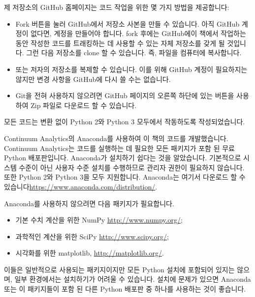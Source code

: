 \documentclass[12pt]{book} \usepackage[width=5.5in,height=8.5in, hmarginratio=3:2,vmarginratio=1:1]{geometry}
\begin{document}
제 저장소의 GitHub 홈페이지는 코드 작업을 위한 몇 가지 방법을 제공합니다: 

\begin{itemize} 

\item {\sf Fork} 버튼을 눌러 GitHub에서 저장소 사본을 만들 수 있습니다. 아직 GitHub 계정이 없다면, 계정을 만들어야 합니다. fork 후에는 GitHub에이 책에서 작업하는 동안 작성한 코드를 트래킹하는 데 사용할 수 있는 자체 저장소를 갖게 될 것입니다. 그런 다음 저장소를 clone 할 수 있습니다. 즉, 파일을 컴퓨터에 복사합니다.  

\item 또는 저자의 저장소를 복제할 수 있습니다. 이를 위해 GitHub 계정이 필요하지는 않지만 변경 사항을 GitHub에 다시 쓸 수는 없습니다.  

\item Git을 전혀 사용하지 않으려면 GitHub 페이지의 오른쪽 하단에 있는 버튼을 사용하여 Zip 파일로 다운로드 할 수 있습니다. 

\end{itemize} 

모든 코드는 변환 없이 Python 2와 Python 3 모두에서 작동하도록 작성되었습니다. 

Continuum Analytics의 Anaconda를 사용하여 이 책의 코드를 개발했습니다. Continuum Analytics는 코드를 실행하는 데 필요한 모든 패키지가 포함 된 무료 Python 배포판입니다. Anaconda가 설치하기 쉽다는 것을 알았습니다. 기본적으로 시스템 수준이 아닌 사용자 수준 설치를 수행하므로 관리자 권한이 필요하지 않습니다. 또한 Python 2와 Python 3을 모두 지원합니다. Anaconda는 여기서 다운로드 할 수 있습니다\url{https://www.anaconda.com/distribution/}.  

Anaconda를 사용하지 않으려면 다음 패키지가 필요합니다. 

\begin{itemize} 

\item 기본 수치 계산을 위한 NumPy \url{http://www.numpy.org/};  

\item 과학적인 계산을 위한 SciPy \url{http://www.scipy.org/};  

\item 시각화를 위한 matplotlib, \url{http://matplotlib.org/}.  

\end{itemize} 

이들은 일반적으로 사용되는 패키지이지만 모든 Python 설치에 포함되어 있지는 않으며, 일부 환경에서는 설치하기가 어려울 수 있습니다. 설치에 문제가 있으면 Anaconda 또는 이 패키지들이 포함 된 다른 Python 배포판 중 하나를 사용하는 것이 좋습니다.  
\end{document}

